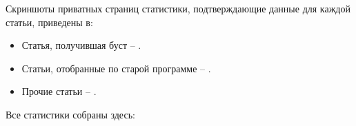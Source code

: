 
Скриншоты приватных страниц статистики, подтверждающие данные для каждой статьи, приведены в:

\vspace{-0.5\baselineskip}
\vspace{-0.5\baselineskip}
\begin{itemize}[nosep]
    \item Статья, получившая буст -- .
    \item Статьи, отобранные по старой программе -- .
    \item Прочие статьи -- .
\end{itemize}

Все статистики собраны здесь:

